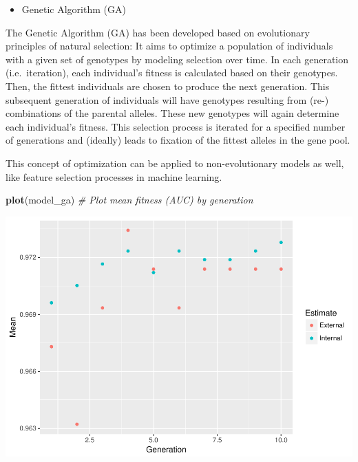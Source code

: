 \documentclass[]{article}
\newenvironment{Shaded}{\begin{snugshade}}{\end{snugshade}}
\newcommand{\KeywordTok}[1]{\textcolor[rgb]{0.13,0.29,0.53}{\textbf{{#1}}}}
\newcommand{\DecValTok}[1]{\textcolor[rgb]{0.00,0.00,0.81}{{#1}}}
\newcommand{\StringTok}[1]{\textcolor[rgb]{0.31,0.60,0.02}{{#1}}}
\newcommand{\CommentTok}[1]{\textcolor[rgb]{0.56,0.35,0.01}{\textit{{#1}}}}
\newcommand{\NormalTok}[1]{{#1}}
\providecommand{\tightlist}{%
  \setlength{\itemsep}{0pt}\setlength{\parskip}{0pt}}
\begin{document}
\begin{itemize}
\tightlist
\item
  Genetic Algorithm (GA)
\end{itemize}

The Genetic Algorithm (GA) has been developed based on evolutionary
principles of natural selection: It aims to optimize a population of
individuals with a given set of genotypes by modeling selection over
time. In each generation (i.e.~iteration), each individual's fitness is
calculated based on their genotypes. Then, the fittest individuals are
chosen to produce the next generation. This subsequent generation of
individuals will have genotypes resulting from (re-) combinations of the
parental alleles. These new genotypes will again determine each
individual's fitness. This selection process is iterated for a specified
number of generations and (ideally) leads to fixation of the fittest
alleles in the gene pool.

This concept of optimization can be applied to non-evolutionary models
as well, like feature selection processes in machine learning.

\begin{Shaded}
\begin{Highlighting}[]
\KeywordTok{plot}\NormalTok{(model_ga) }\CommentTok{# Plot mean fitness (AUC) by generation}
\end{Highlighting}
\end{Shaded}

\includegraphics{webinar_code_files/figure-latex/unnamed-chunk-33-1.pdf}

\begin{Shaded}
\end{Shaded}
\end{document}
